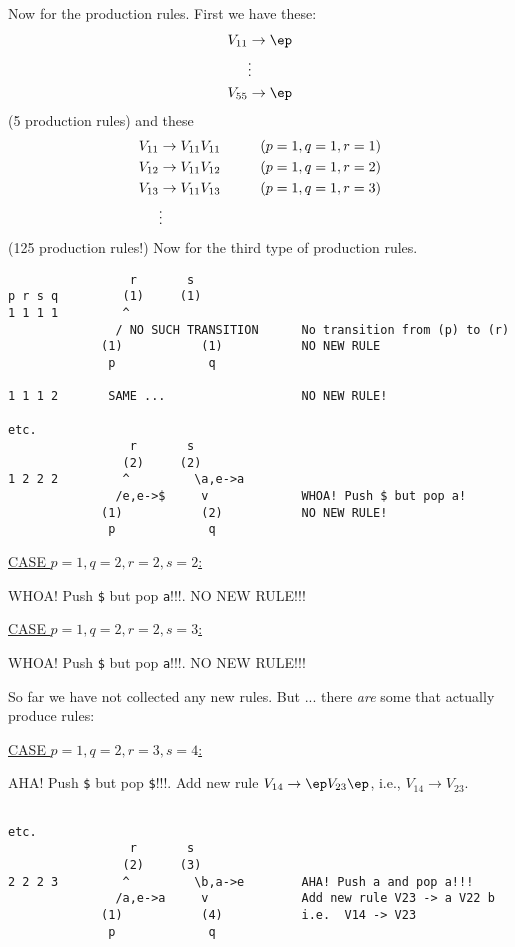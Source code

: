 Now for the production rules.
First we have these:
\begin{align*}
V_{11} &\rightarrow \ep \\
&\vdots \\
V_{55} &\rightarrow \ep \\
\end{align*}
(5 production rules)
and these
\begin{align*}
V_{11} &\rightarrow V_{11} V_{11} \hskip 1cm (p = 1, q = 1, r = 1) \\
V_{12} &\rightarrow V_{11} V_{12} \hskip 1cm (p = 1, q = 1, r = 2) \\
V_{13} &\rightarrow V_{11} V_{13} \hskip 1cm (p = 1, q = 1, r = 3) \\
&\vdots
\end{align*}
(125 production rules!)
Now for the third type of production rules.
\begin{verbatim}
                 r       s
p r s q         (1)     (1)        
1 1 1 1         ^
               / NO SUCH TRANSITION      No transition from (p) to (r)
             (1)           (1)           NO NEW RULE
              p             q

1 1 1 2       SAME ...                   NO NEW RULE!

etc.
                 r       s
                (2)     (2)        
1 2 2 2         ^         \a,e->a
               /e,e->$     v             WHOA! Push $ but pop a!    
             (1)           (2)           NO NEW RULE!
              p             q

\end{verbatim}



\underline{CASE $p=1,q=2,r=2,s=2$:}

WHOA! Push \verb!$! but pop \verb!a!!!!. NO NEW RULE!!!

\underline{CASE $p=1,q=2,r=2,s=3$:}

WHOA! Push \verb!$! but pop \verb!a!!!!. NO NEW RULE!!!


So far we have not collected any new rules.
But ... there \textit{are} some that actually produce rules:


\underline{CASE $p=1,q=2,r=3,s=4$:}

AHA! Push \verb!$! but pop \verb!$!!!!. 
Add new rule $V_{14} \rightarrow \ep V_{23} \ep$, i.e.,
$V_{14} \rightarrow V_{23}$.


\begin{samepage}
\begin{verbatim}

etc.
                 r       s
                (2)     (3)        
2 2 2 3         ^         \b,a->e        AHA! Push a and pop a!!!
               /a,e->a     v             Add new rule V23 -> a V22 b
             (1)           (4)           i.e.  V14 -> V23
              p             q

\end{verbatim}
\end{samepage}

